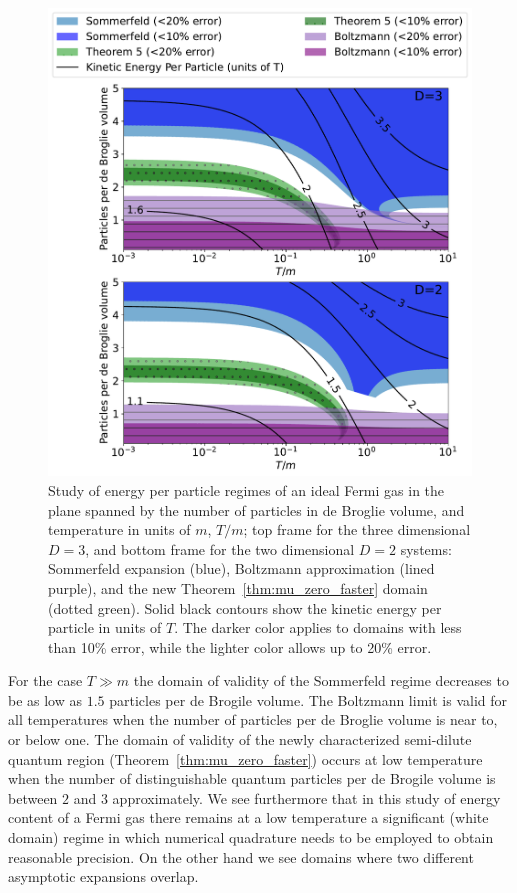 \documentclass[sn-mathphys,Numbered]{sn-jnl}
\newcommand*{\xred}{\color{black}}
\newcommand{\rTh}[1]{Theorem~{\ref{#1}}}
\begin{document}
{%
\begin{figure} %
\centering
 \includegraphics[width=.8\textwidth]{plot/Sommerfeld_vs_ours_vs_Boltzmann_regions_1_term_T_dB_plane.pdf}
\caption{{\xred
Study of energy per particle regimes of an ideal Fermi gas in the plane spanned by the number of particles in de Broglie volume, and temperature in units of $m$, $T/m$; top frame for the three dimensional $D=3$, and bottom frame for the two dimensional $D=2$ systems: Sommerfeld expansion (blue), Boltzmann approximation (lined purple), and the new \rTh{thm:mu_zero_faster} domain (dotted green). Solid black contours show the kinetic energy per particle in units of $T$. The darker color applies to domains with less than 10\% error, while the lighter color allows up to 20\% error.}}\label{fig:2-NTT}
\end{figure}

For the case $T\gg m$ the domain of validity of the Sommerfeld regime decreases to be as low as $1.5$ particles per de Brogile volume. The Boltzmann limit is valid for all temperatures when the number of particles per de Broglie volume is near to, or below one. The domain of validity of the newly characterized semi-dilute quantum region (\rTh{thm:mu_zero_faster}) occurs at low temperature when the number of distinguishable quantum particles per de Brogile volume is between $2$ and $3$ approximately. We see furthermore that in this study of energy content of a Fermi gas there remains at a low temperature a significant (white domain) regime in which numerical quadrature needs to be employed to obtain reasonable precision. On the other hand we see domains where two different asymptotic expansions overlap.

}
\end{document}
